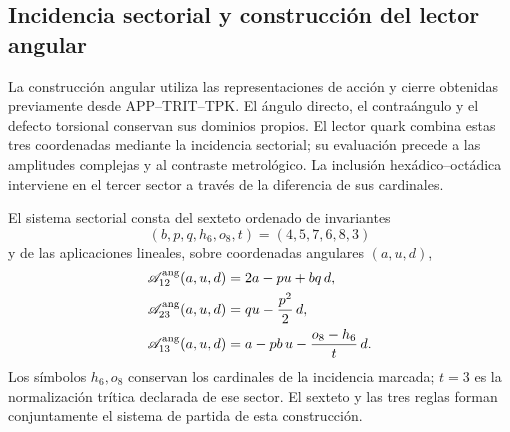
\subsection{Incidencia sectorial y construcción del lector angular}
\label{sec:ii09-construccion-sectorial}

La construcción angular utiliza las representaciones de acción y cierre
obtenidas previamente desde APP--TRIT--TPK. El ángulo directo, el
contraángulo y el defecto torsional conservan sus dominios propios.
El lector quark combina estas tres coordenadas mediante la incidencia
sectorial; su evaluación precede a las amplitudes complejas y al
contraste metrológico. La inclusión hexádico--octádica interviene en
el tercer sector a través de la diferencia de sus cardinales.





\begin{definition}
\label{def:ii09-sistema-sectorial}
El sistema sectorial consta del sexteto ordenado de invariantes
\[
 (b,p,q,h_6,o_8,t)=(4,5,7,6,8,3)
\]
y de las aplicaciones lineales, sobre coordenadas angulares
\((a,u,d)\),
\begin{align}
 \mathscr A_{12}^{\rm ang}(a,u,d)&=2a-pu+bq\,d,\label{eq:ii09-sector12}\\
 \mathscr A_{23}^{\rm ang}(a,u,d)&=qu-\frac{p^2}{2}\,d,\label{eq:ii09-sector23}\\
 \mathscr A_{13}^{\rm ang}(a,u,d)&=a-pb\,u-\frac{o_8-h_6}{t}\,d.
 \label{eq:ii09-sector13}
\end{align}
Los símbolos \(h_6,o_8\) conservan los cardinales de la incidencia
marcada; \(t=3\) es la normalización trítica declarada de ese sector.
El sexteto y las tres reglas forman conjuntamente el sistema de
partida de esta construcción.
\end{definition}


